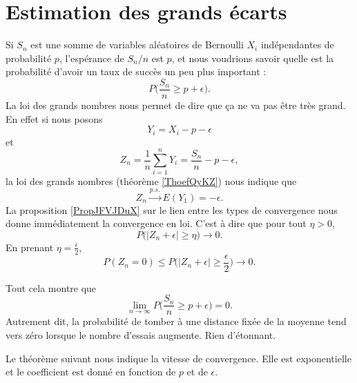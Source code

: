 \section{Estimation des grands écarts}

Si \( S_n\) est une somme de variables aléatoires de Bernoulli \( X_i\) indépendantes de probabilité \( p\), l'espérance de \( S_n/n\) est \( p\), et nous voudrions savoir quelle est la probabilité d'avoir un taux de succès un peu plus important :
\begin{equation}
    P\big( \frac{ S_n }{ n }\geq p+\epsilon \big).
\end{equation}
La loi des grands nombres nous permet de dire que ça ne va pas être très grand. En effet si nous posons
\begin{equation}
    Y_i=X_i-p-\epsilon
\end{equation}
et
\begin{equation}
    Z_n=\frac{1}{ n }\sum_{i=1}^nY_i=\frac{ S_n }{ n }-p-\epsilon,
\end{equation}
la loi des grands nombres (théorème \ref{ThoefQyKZ}) nous indique que
\begin{equation}
    Z_n\stackrel{p.s.}{\longrightarrow}E(Y_1)=-\epsilon.
\end{equation}
La proposition \ref{PropJFVJDuX} sur le lien entre les types de convergence nous donne immédiatement la convergence en loi. C'est à dire que pour tout \( \eta>0\),
\begin{equation}
    P\Big( | Z_n+\epsilon |\geq \eta \Big)\to 0.
\end{equation}
En prenant \( \eta=\frac{ \epsilon }{2}\),
\begin{equation}
    P(Z_n=0)\leq P\big( | Z_n+\epsilon |\geq \frac{ \epsilon }{2} \big)\to 0.
\end{equation}

Tout cela montre que
\begin{equation}
    \lim_{n\to \infty} P\big( \frac{ S_n }{ n }\geq p+\epsilon \big)=0.
\end{equation}
Autrement dit, la probabilité de tomber à une distance fixée de la moyenne tend vers zéro lorsque le nombre d'essais augmente. Rien d'étonnant.

Le théorème suivant nous indique la vitesse de convergence. Elle est exponentielle et le coefficient est donné en fonction de \( p\) et de \( \epsilon\).

